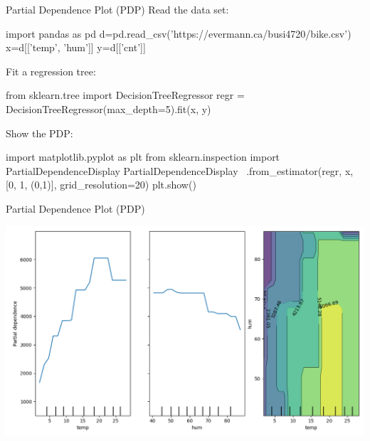 \documentclass[ignorenonframetext,xcolor=x11names]{beamer}
\begin{document}




\begin{frame}[fragile]{Partial Dependence Plot (PDP)}
Read the data set:
\begin{pythoncode}
import pandas as pd
d=pd.read_csv('https://evermann.ca/busi4720/bike.csv')
x=d[['temp', 'hum']]
y=d[['cnt']]
\end{pythoncode}
Fit a regression tree:
\begin{pythoncode}
from sklearn.tree import DecisionTreeRegressor
regr = DecisionTreeRegressor(max_depth=5).fit(x, y)
\end{pythoncode}
Show the PDP:
\begin{pythoncode}
import matplotlib.pyplot as plt
from sklearn.inspection import PartialDependenceDisplay
PartialDependenceDisplay \
    .from_estimator(regr, x, [0, 1, (0,1)],
        grid_resolution=20)
plt.show()
\end{pythoncode}
\end{frame}

\begin{frame}{Partial Dependence Plot (PDP)}
\begin{center}
\includegraphics[width=\textwidth]{pdp_dtr.png}
\end{center}
\end{frame}
\end{document}
